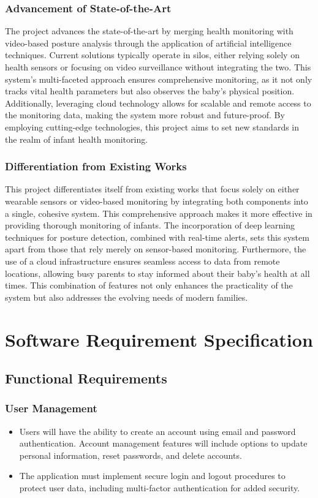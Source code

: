 \documentclass[12pt,a4paper]{report}
\begin{document}
\subsection{Advancement of State-of-the-Art}
The project advances the state-of-the-art by merging health monitoring with video-based posture analysis through the application of artificial intelligence techniques. Current solutions typically operate in silos, either relying solely on health sensors or focusing on video surveillance without integrating the two. This system’s multi-faceted approach ensures comprehensive monitoring, as it not only tracks vital health parameters but also observes the baby’s physical position. Additionally, leveraging cloud technology allows for scalable and remote access to the monitoring data, making the system more robust and future-proof. By employing cutting-edge technologies, this project aims to set new standards in the realm of infant health monitoring.

\subsection{Differentiation from Existing Works}
This project differentiates itself from existing works that focus solely on either wearable sensors or video-based monitoring by integrating both components into a single, cohesive system. This comprehensive approach makes it more effective in providing thorough monitoring of infants. The incorporation of deep learning techniques for posture detection, combined with real-time alerts, sets this system apart from those that rely merely on sensor-based monitoring. Furthermore, the use of a cloud infrastructure ensures seamless access to data from remote locations, allowing busy parents to stay informed about their baby’s health at all times. This combination of features not only enhances the practicality of the system but also addresses the evolving needs of modern families.


\chapter{Software Requirement Specification}

\section{Functional Requirements}

\subsection{User Management}
\begin{itemize}
  \item Users will have the ability to create an account using email and password authentication. Account management features will include options to update personal information, reset passwords, and delete accounts.
  \item The application must implement secure login and logout procedures to protect user data, including multi-factor authentication for added security.
\end{itemize}
\end{document}
